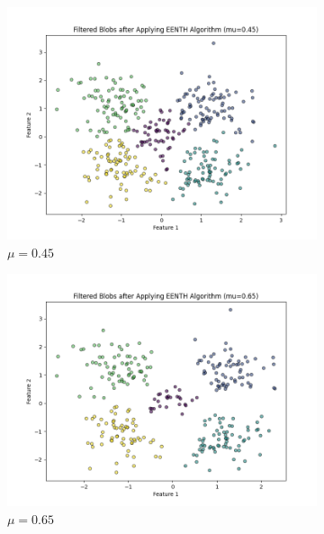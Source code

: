 \begin{figure}[ht]
	\centering
	\begin{subfigure}[b]{0.3\textwidth}
		\centering
		\includegraphics[width=\textwidth]{figures/eenth/filtered_blobs_mu_0.45}
		\caption{$\mu = 0.45$}
		\label{fig:mu0.45}
	\end{subfigure}
	\hfill
	\begin{subfigure}[b]{0.3\textwidth}
		\centering
		\includegraphics[width=\textwidth]{figures/eenth/filtered_blobs_mu_0.65}
		\caption{$\mu = 0.65$}
		\label{fig:mu0.65}
	\end{subfigure}
	\hfill
	\begin{subfigure}[b]{0.3\textwidth}
		\centering

\end{subfigure}
\end{figure}
